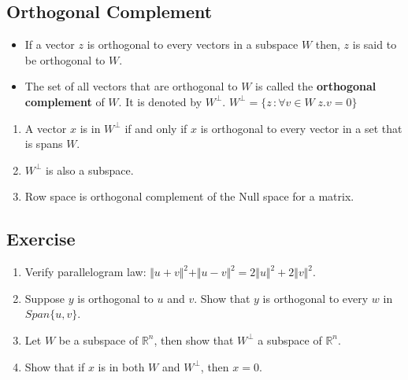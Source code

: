 \documentclass[aima104_lecturenotes_ku.tex]{subfiles}
\begin{document}
\subsection{Orthogonal Complement}
\begin{itemize}
\item If a vector $z$ is orthogonal to every vectors in a subspace $W$ then, $z$ is said to be orthogonal to $W$.

\item The set of all vectors that are orthogonal to $W$ is called the \textbf{orthogonal complement} of $W$. It is denoted by $W^{\perp}$. $W^{\perp} = \{z \, : \forall v \in W \;  z.v=0 \} $
\end{itemize}

\begin{thm}
  \begin{enumerate}
  \item A vector $x$ is in $W^{\perp}$ if and only if $x$ is orthogonal to every vector in a set that is spans $W$.
  \item $W^{\perp}$ is also a subspace.
   \item Row space is orthogonal complement of the Null space for a matrix.
  \end{enumerate}
\end{thm}

\subsection{Exercise}
\begin{enumerate}
 \item Verify parallelogram law: $\Vert u+v \Vert ^2 + \Vert u-v \Vert ^2 = 2 \Vert u \Vert ^2 + 2 \Vert v \Vert ^2$.
 \item Suppose $y$ is orthogonal to $u$ and $v$. Show that $y$ is orthogonal to every $w$ in $Span\{u,v\}$.
 \item Let $W$ be a subspace of $\mathbb{R}^n$, then show that $W^{\perp}$ a subspace of $\mathbb{R}^n$.
\item Show that if $x$ is in both $W$ and $W^{\perp}$, then $x=0$.
\end{enumerate}
\end{document}
